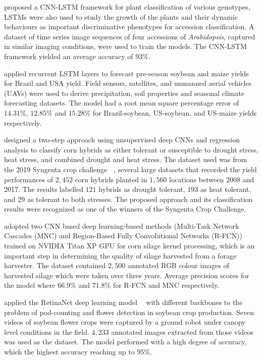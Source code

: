 \documentclass[12pt]{report}
\numberwithin{equation}{section}
\begin{document}
\textbf{\cite{taghavi:18}} proposed a CNN-LSTM framework for plant classification of various genotypes, LSTMs were also used to study the growth of the plants and their dynamic behaviours as important discriminative phenotypes for accession classification. A dataset of time series image sequences of four accessions of \textit{Arabidopsis}, captured in similar imaging conditions, were used to train the models. The CNN-LSTM framework yielded an average accuracy of $93\%$.

\textbf{\cite{oliveira2018scalable}} applied recurrent LSTM layers to forecast pre-season soybean and maize yields for Brazil and USA yield. Field sensors, satellites, and unmanned aerial vehicles (UAVs) were used to derive precipitation, soil properties and seasonal climate forecasting datasets. The model had a root mean square percentage error of $14.31\%$, $12.85\%$ and  $15.28\%$ for Brazil-soybean, US-soybean, and  US-maize yields respectively. 

\textbf{\cite{agronomy9120833}} designed a two-step approach using unsupervised  deep CNNs and regression analysis to classify corn hybrids as either tolerant or susceptible to drought stress, heat stress, and combined drought and heat stress. The dataset used was from the 2019 Syngenta crop challenge \textbf{~\cite{syngenta}}, several large datasets that recorded the yield performances of $2,452$ corn hybrids planted in $1,560$ locations between 2008 and 2017. The results labelled $121$ hybrids as drought tolerant, $193$ as heat tolerant, and $29$ as tolerant to both stresses. The proposed approach and its classification results were recognized as one of the winners of the Syngenta Crop Challenge.

\textbf{\cite{rasmussen2019maize}} adopted two CNN based deep learning-based methods (Multi-Task Network Cascades (MNC) and Region-Based Fully Convolutional Networks (R-FCN)) trained on NVIDIA Titan XP GPU  for corn silage kernel processing, which is an important step in determining the quality of silage harvested from a forage harvester. The dataset contained $2,500$ annotated RGB colour images of harvested silage which were taken over three years. Average precision scores for the model where $66.9\%$ and $71.8\%$ for R-FCN and MNC respectively.

\textbf{\cite{zhang2019deep}} applied the RetinaNet deep learning model \textbf{~\cite{lin2017focal}} with different backbones to the problem of pod-counting and  flower detection in soybean crop production. Seven videos of soybean flower crops were captured by a ground robot under canopy level conditions in the field. $4,233$ annotated images extracted from those videos was used as the dataset. The model performed with a high degree of accuracy, which the highest accuracy reaching up to $95\%$.
\end{document}

